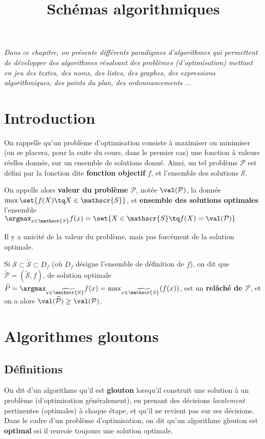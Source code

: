 \documentclass{scrartcl}
\title{Schémas algorithmiques}
\author{}
\date{}
\begin{document}
	\maketitle
	\begin{center}
		\textsl{Dans ce chapitre, on présente différents paradigmes d'algorithmes qui permettent de développer des algorithmes résolvant des problèmes (d'optimisation)
		mettant en jeu des textes, des noms, des listes, des graphes, des expressions algorithmiques, des points du plan, des ordonnancements ...}
	\end{center}

	\section{Introduction}
		On rappelle qu'un problème d'optimisation consiste à maximiser ou minimiser (on se placera, pour la suite du cours, dans le premier cas) une fonction à valeurs réelles donnée, 
		sur un ensemble de solutions donné. 
		Ainsi, un tel problème $\mathcal{P}$ est défini par la fonction dite \textbf{fonction objectif} $f$, 
		et l'ensemble des solutions $\mathscr{S}$.
		
		On appelle alors \textbf{valeur du problème $\mathcal{P}$}, notée $\val(\mathcal{P})$, la donnée $\max \set{f(X) \tq X \in \mathscr{S}}$,
		et \textbf{ensemble des solutions optimales} l'ensemble $\argmax_{x\in\mathscr{S}} f(x) = \set{X \in \mathscr{S} \tq f(X) = \val(\mathcal{P})}$
	
		\rem Il y a unicité de la valeur du problème, mais pas forcément de la solution optimale.

		Si $\mathscr{S} \subset \widetilde{\mathscr{S}} \subset D_f$ (où $D_f$ désigne l'ensemble de définition de $f$), 
		on dit que $\widetilde{\mathcal{P}} = (\widetilde{\mathscr{S}},f)$, 
		de solution optimale $\widetilde{P} = \argmax_{x \in \widetilde{\mathscr{S}}} f(x) = \max_{x\in\widetilde{\mathscr{S}}}(f(x))$, 
		est un \textbf{relâché de $\mathcal{P}$}, et on a alors $\val(\widetilde{\mathcal{P}}) \geq \val(\mathcal{P})$. 


	\section{Algorithmes gloutons}
		\subsection{Définitions}
			On dit d'un algorithme qu'il est \textbf{glouton} lorsqu'il construit une solution à un problème (d'optimisation généralement), 
			en prenant des décisions \textsl{localement} pertinentes (optimales) à chaque étape, et qu'il ne revient pas sur ses décisions.
			Dans le cadre d'un problème d'optimisation, on dit qu'un algorithme glouton est \textbf{optimal} ssi il renvoie toujours une solution optimale.
			
\end{document}
